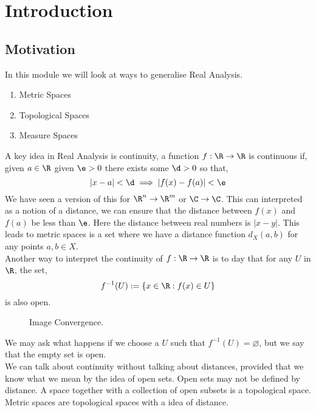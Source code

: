 
\section{Introduction}
\subsection{Motivation}

In this module we will look at ways to generalise Real Analysis.
\begin{enumerate}
  \item Metric Spaces
  \item Topological Spaces
  \item Measure Spaces
\end{enumerate}
A key idea in Real Analysis is continuity, a function $f : \R \to \R$ is continuous if, given $a \in \R$ given $\e > 0$ there exists some $\d > 0$ so that,
$$ |x - a| < \d \implies |f(x) - f(a)| < \e $$
We have seen a version of this for $\R^n \to \R^m$ or $\C \to \C$. This can interpreted as a notion of a distance, we can ensure that the distance between $f(x)$ and $f(a)$ be less than $\e$. Here the distance between real numbers is $|x - y|$. This leads to metric spaces is a set where we have a distance function $d_X(a, b)$ for any points $a, b \in X$.\\

\noindent
Another way to interpret the continuity of $f : \R \to \R$ is to day that for any $U$ in
$\R$, the set,
$$ f^{-1}(U) := \{x \in \R : f(x) \in U\} $$
is also open.

\begin{wrapfigure}{r}{0.4\textwidth}
  \centering
  \resizebox{0.4\textwidth}{!}{}
  \caption{Image Convergence.}
\end{wrapfigure}

We may ask what happens if we choose a $U$ such that $f^{-1}(U) = \varnothing$, but we say that the empty set is open.\\

\noindent
We can talk about continuity without talking about distances, provided that we know what we mean by the idea of open sets. Open sets may not be defined by distance. A space together with a collection of open subsets is a topological space. Metric spaces are topological spaces with a idea of distance.\\

